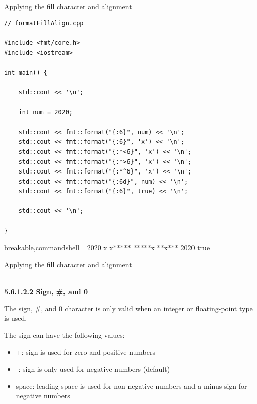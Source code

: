 \hspace*{\fill} \\ %
\noindent
Applying the fill character and alignment
\begin{lstlisting}[style=styleCXX]
// formatFillAlign.cpp

#include <fmt/core.h>
#include <iostream>

int main() {
	
	std::cout << '\n';
	
	int num = 2020;
	
	std::cout << fmt::format("{:6}", num) << '\n';
	std::cout << fmt::format("{:6}", 'x') << '\n';
	std::cout << fmt::format("{:*<6}", 'x') << '\n';
	std::cout << fmt::format("{:*>6}", 'x') << '\n';
	std::cout << fmt::format("{:*^6}", 'x') << '\n';
	std::cout << fmt::format("{:6d}", num) << '\n';
	std::cout << fmt::format("{:6}", true) << '\n';
	
	std::cout << '\n';
	
}
\end{lstlisting}

\begin{tcblisting}{breakable,commandshell={}}
  2020
x
x*****
*****x
**x***
  2020
true
\end{tcblisting}

\begin{center}
Applying the fill character and alignment
\end{center}

\hspace*{\fill} \\ %
\noindent
\textbf{5.6.1.2.2\hspace{0.2cm} Sign, \#, and 0}

The sign, \#, and 0 character is only valid when an integer or floating-point type is used.

The sign can have the following values:

\begin{itemize}
\item 
+: sign is used for zero and positive numbers

\item 
-: sign is only used for negative numbers (default)

\item 
space: leading space is used for non-negative numbers and a minus sign for negative numbers
\end{itemize}

